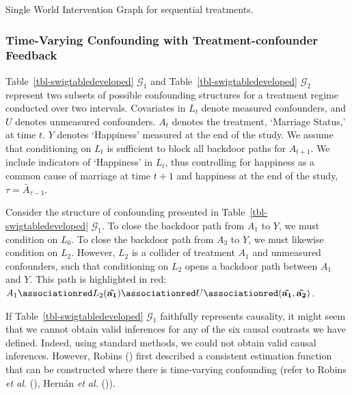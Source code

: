 \documentclass[
  single column]{article}
\begin{document}
\begin{table}

\caption{\label{tbl-swigtabledeveloped}Single World Intervention Graph
for sequential treatments.}

\centering{

\swigtabledeveloped

}

\end{table}%

\subsubsection{Time-Varying Confounding with Treatment-confounder
Feedback}\label{time-varying-confounding-with-treatment-confounder-feedback}

Table~\ref{tbl-swigtabledeveloped} \(\mathcal{G}_1\) and
Table~\ref{tbl-swigtabledeveloped} \(\mathcal{G}_2\) represent two
subsets of possible confounding structures for a treatment regime
conducted over two intervals. Covariates in \(L_t\) denote measured
confounders, and \(U\) denotes unmeasured confounders. \(A_t\) denotes
the treatment, `Marriage Status,' at time \(t\). \(Y\) denotes
`Happiness' measured at the end of the study. We assume that
conditioning on \(L_t\) is sufficient to block all backdoor paths for
\(A_{t+1}\). We include indicators of `Happiness' in \(L_t\), thus
controlling for happiness as a common cause of marriage at time \(t+1\)
and happiness at the end of the study, \(\tau = \bar{A}_{\tau -1}\).

Consider the structure of confounding presented in
Table~\ref{tbl-swigtabledeveloped} \(\mathcal{G}_1\). To close the
backdoor path from \(A_1\) to \(Y\), we must condition on \(L_0\). To
close the backdoor path from \(A_3\) to \(Y\), we must likewise
condition on \(L_2\). However, \(L_2\) is a collider of treatment
\(A_1\) and unmeasured confounders, such that conditioning on \(L_2\)
opens a backdoor path between \(A_1\) and \(Y\). This path is
highlighted in red:
\(A_1 \associationred L_2({\mathbf{\tilde{a_1}}}) \associationred U \associationred ({\mathbf{\tilde{a_1}, \tilde{a_2}}})\).

If Table~\ref{tbl-swigtabledeveloped} \(\mathcal{G}_1\) faithfully
represents causality, it might seem that we cannot obtain valid
inferences for any of the six causal contrasts we have defined. Indeed,
using standard methods, we could not obtain valid causal inferences.
However, Robins () first described a
consistent estimation function that can be constructed where there is
time-varying confounding (refer to Robins \emph{et al.}
(), Hernán \emph{et al.}
()).
\end{document}

